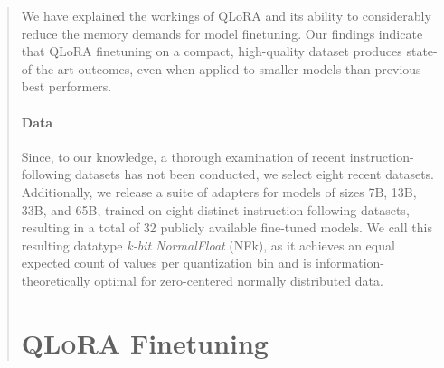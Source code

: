 \begin{quote}
We have explained the workings of QLoRA and its ability to considerably reduce the memory demands for model finetuning. Our findings indicate that QLoRA finetuning on a compact, high-quality dataset produces state-of-the-art outcomes, even when applied to smaller models than previous best performers. \paragraph{Data} Since, to our knowledge, a thorough examination of recent instruction-following datasets has not been conducted, we select eight recent datasets. Additionally, we release a suite of adapters for models of sizes 7B, 13B, 33B, and 65B, trained on eight distinct instruction-following datasets, resulting in a total of 32 publicly available fine-tuned models. We call this resulting datatype \emph{k-bit NormalFloat} (NFk), as it achieves an equal expected count of values per quantization bin and is information-theoretically optimal for zero-centered normally distributed data. \section{\textsc{QLoRA} Finetuning}


\end{quote}
